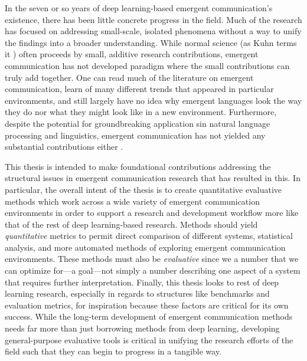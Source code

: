 In the seven or so years of deep learning-based emergent communication's existence, there has been little concrete progress in the field.
Much of the research has focused on addressing small-scale, isolated phenomena without a way to unify the findings into a broader understanding.
While normal science (as Kuhn terms it ) often proceeds by small, additive research contributions, emergent communication has not developed paradigm where the small contributions can truly add together.
One can read much of the literature on emergent communication, learn of many different trends that appeared in particular environments, and still largely have no idea why emergent languages look the way they do nor what they might look like in a new environment.
Furthermore, despite the potential for groundbreaking application sin natural language processing and linguistics, emergent communication has not yielded any substantial contributions either .

This thesis is intended to make foundational contributions addressing the structural issues in emergent communication research that has resulted in this.
In particular, the overall intent of the thesis is to create quantitative evaluative methods which work across a wide variety of emergent communication environments in order to support a research and development workflow more like that of the rest of deep learning-based research.
Methods should yield \emph{quantitative} metrics to permit direct comparison of different systems, statistical analysis, and more automated methods of exploring emergent communication environments.
These methods must also be \emph{evaluative} since we a number that we can optimize for---a goal---not simply a number describing one aspect of a system that requires further interpretation.
Finally, this thesis looks to rest of deep learning research, especially in regards to structures like benchmarks and evaluation metrics, for inspiration because these factors are critical for its own success.
While the long-term development of emergent communication methods needs far more than just borrowing methods from deep learning, developing general-purpose evaluative tools is critical in unifying the research efforts of the field such that they can begin to progress in a tangible way.

